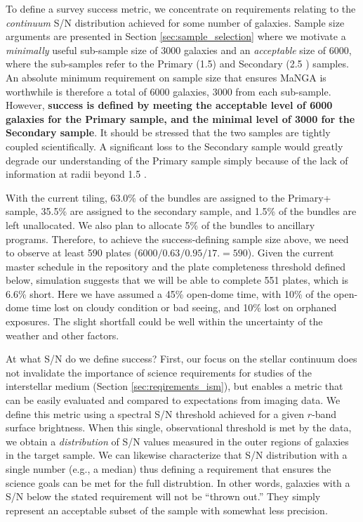 \documentclass[11pt,a4paper,twoside,onecolumn,openany,final,oldfontcommands]{memoir}
\begin{document}
To define a survey success metric, we concentrate on requirements relating to the {\em continuum} S/N distribution achieved for some number of galaxies.  Sample size arguments are presented in Section \ref{sec:sample_selection} where we motivate a {\em minimally} useful sub-sample size of 3000 galaxies and an {\em acceptable} size of 6000, where the sub-samples refer to the Primary (1.5\Reff) and Secondary (2.5 \Reff) samples.  An absolute minimum requirement on sample size that ensures MaNGA is worthwhile is therefore a total of 6000 galaxies, 3000 from each sub-sample. However, {\bf success is defined by meeting the acceptable level of 6000 galaxies for the Primary sample, and the minimal level of 3000 for the Secondary sample}.  It should be stressed that the two samples are tightly coupled scientifically.  A significant loss to the Secondary sample would greatly degrade our understanding of the Primary sample simply because of the lack of information at radii beyond 1.5 \Reff.

With the current tiling, 63.0\% of the bundles are assigned to the Primary+ sample, 35.5\% are assigned to the secondary sample, and 1.5\% of the bundles are left unallocated. We also plan to allocate 5\% of the bundles to ancillary programs. Therefore, to achieve the success-defining sample size above, we need to observe at least 590 plates ($6000/0.63/0.95/17.= 590$). Given the current master schedule in the repository and the plate completeness threshold defined below, simulation suggests that we will be able to complete 551 plates, which is 6.6\% short. Here we have assumed a 45\% open-dome time, with 10\% of the open-dome time lost on cloudy condition or bad seeing, and 10\% lost on orphaned exposures. The slight shortfall could be well within the uncertainty of the weather and other factors. 

At what S/N do we define success? First, our focus on the stellar continuum does not invalidate the importance of science requirements for studies of the interstellar medium (Section \ref{sec:reqirements_ism}), but enables a metric that can be easily evaluated and compared to expectations from imaging data.  We define this metric using a spectral S/N threshold achieved for a given $r$-band surface brightness.  When this single, observational threshold is met by the data, we obtain a {\em distribution} of S/N values measured in the outer regions of galaxies in the target sample. We can likewise characterize that S/N distribution with a single number (e.g., a median) thus defining a requirement that ensures the science goals can be met for the full distrubtion.  In other words, galaxies with a S/N below the stated requirement will not be ``thrown out.''  They simply represent an acceptable subset of the sample with somewhat less precision.
\end{document}

